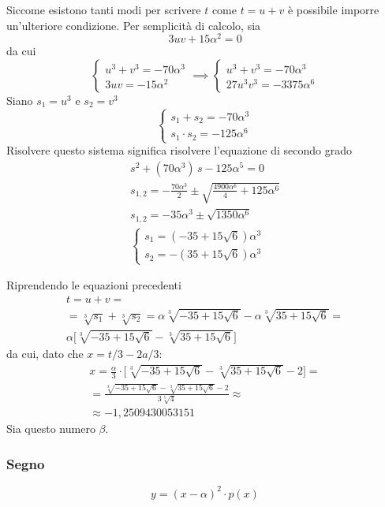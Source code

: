 Siccome esistono tanti modi per scrivere $t$ come $t=u+v$ è possibile imporre un'ulteriore condizione. Per semplicità di calcolo, sia
\[
3uv+15\alpha^2=0
\]
da cui
\[
\begin{cases}
u^3+v^3=-70\alpha^3\\
3uv=-15\alpha^2
\end{cases}
\implies\begin{cases}
u^3+v^3=-70\alpha^3\\
27u^3v^3=-3375\alpha^6
\end{cases}
\]
Siano $s_1=u^3$ e $s_2=v^3$
\[
\begin{cases}
s_1+s_2=-70\alpha^3\\
s_1\cdot s_2=-125\alpha^6
\end{cases}
\]
Risolvere questo sistema significa risolvere l'equazione di secondo grado
\begin{gather*}
s^2+(70\alpha^3)\,s-125\alpha^5=0\\
s_{1,2}=-\frac{70\alpha^3}{2}\pm\sqrt{\frac{4900\alpha^6}{4}+125\alpha^6}\\
s_{1,2}=-35\alpha^3\pm\sqrt{1350\alpha^6}\\
\begin{cases}
s_1=(-35+15\sqrt{6})\alpha^3\\
s_2=-(35+15\sqrt{6})\alpha^3
\end{cases}
\end{gather*}

Riprendendo le equazioni precedenti
\begin{multline*}
t=u+v=\\
=\sqrt[3]{s_1}+\sqrt[3]{s_2}=\alpha\sqrt[3]{-35+15\sqrt{6}}-\alpha\sqrt[3]{35+15\sqrt{6}}=\\
\alpha\Bigg[\sqrt[3]{-35+15\sqrt{6}}-\sqrt[3]{35+15\sqrt{6}}\Bigg]
\end{multline*}
da cui, dato che $x=t/3-2a/3$:
\begin{multline*}
x=\frac{\alpha}{3}\cdot\Bigg[\sqrt[3]{-35+15\sqrt{6}}-\sqrt[3]{35+15\sqrt{6}}-2\Bigg]=\\
=\frac{\sqrt[3]{-35+15\sqrt{6}}-\sqrt[3]{35+15\sqrt{6}}-2}{3\sqrt[5]{4}}\approx\\
\approx -1,2509430053151
\end{multline*}
Sia questo numero $\beta$.

\subsubsection*{Segno}
\[
y=(x-\alpha)^2\cdot p(x)
\]

